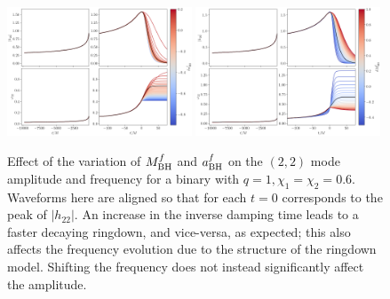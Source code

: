 \documentclass[prd,amssymb,amsmath,amsfonts,nofootinbib,reprint,showpacs,longbibliography]{revtex4-1}
\def\mbhf{M_{\rm BH}^f}
\def\abhf{a_{\rm BH}^f}
\begin{document}
\begin{figure}
    \includegraphics[width=0.49\textwidth]{figs/delta_abhf_-0.9_0.2.png}
    \includegraphics[width=0.49\textwidth]{figs/delta_Mbhf_-0.5_1.0.png}
    \caption{Effect of the variation of $\mbhf$ and $\abhf$ on the $(2,2)$ mode amplitude and frequency
    for a binary with $q = 1, \chi_1 = \chi_2 = 0.6$. Waveforms here are aligned so that for each
    $t = 0$ corresponds to the peak of $|h_{22}|$. An increase in the inverse damping time leads to a faster
    decaying ringdown, and vice-versa, as expected; this also affects the frequency evolution due to the structure of the
    ringdown model. Shifting the frequency does not instead significantly affect the amplitude.}
\end{figure}
\end{document}

